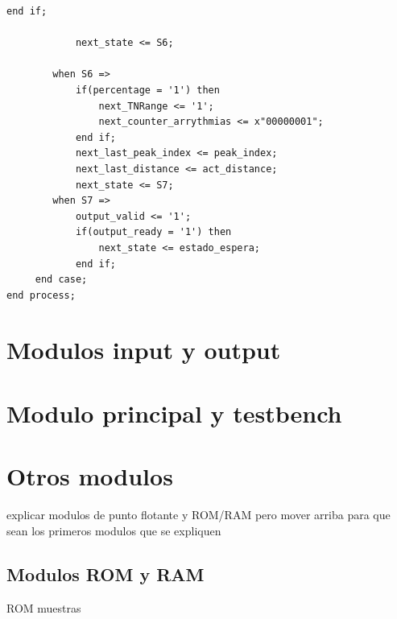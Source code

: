\begin{lstlisting}[frame=single]
            end if;            
 
            next_state <= S6;

        when S6 => 
            if(percentage = '1') then
                next_TNRange <= '1';
                next_counter_arrythmias <= x"00000001";
            end if; 
            next_last_peak_index <= peak_index;
            next_last_distance <= act_distance;
            next_state <= S7;
        when S7 =>          
            output_valid <= '1';
            if(output_ready = '1') then 
                next_state <= estado_espera;
            end if;
     end case;
end process;
\end{lstlisting}

\section {Modulos input y output}

\section{Modulo principal y testbench}


\section{Otros modulos} 
explicar modulos de punto flotante y ROM/RAM pero mover
arriba para que sean los primeros modulos que se expliquen
\subsection{Modulos ROM y RAM}
 ROM muestras

